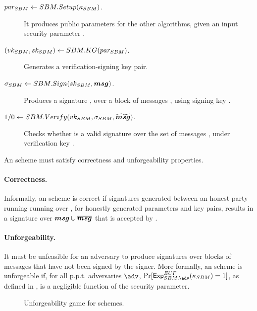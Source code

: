 \begin{description}
\item[$par_{SBM} \gets SBM.Setup(\kappa_{SBM})$.] It produces public parameters
  for the other algorithms, given an input security parameter \SBMsecpar.
\item[$(vk_{SBM},sk_{SBM}) \gets SBM.KG(par_{SBM})$.] Generates a
  verification-signing key pair.
\item[$\sigma_{SBM} \gets SBM.Sign(sk_{SBM},\boldsymbol{msg})$.] Produces a signature \sig, over
  a block of messages \smsg, using signing key \SBMsk.
\item[$1/0 \gets SBM.Verify(vk_{SBM},\sigma_{SBM},\widetilde{\boldsymbol{msg}})$.] Checks
  whether \SBMsig is a valid signature over the set of messages \smsg, under
  verification key \SBMvk.
\end{description}

An \SBM scheme must satisfy correctness and unforgeability properties.

\paragraph{Correctness.} %
Informally, an \SBM scheme is correct if signatures generated between an honest
party running running \SBMSign over \smsg, for honestly generated parameters
and key pairs, results in a signature over $\boldsymbol{msg} \cup \overline{\boldsymbol{msg}}$ that is
accepted by \SBMVerify.

\paragraph{Unforgeability.} %
It must be unfeasible for an adversary to produce signatures over blocks of
messages that have not been signed by the signer. More formally, an \SBM scheme
is unforgeable if, for all p.p.t. adversaries $\adv$, $\Pr[\ExpSBMEUF
(\SBMsecpar) = 1]$, as defined in , is a negligible
function of the security parameter. 

\begin{figure}[ht!]
  \begin{minipage}[t]{\textwidth}
    \centering    
  \end{minipage}
  \label{fig:sbm-games}
  \caption{Unforgeability game for \SBM schemes.}
\end{figure}
\fi


